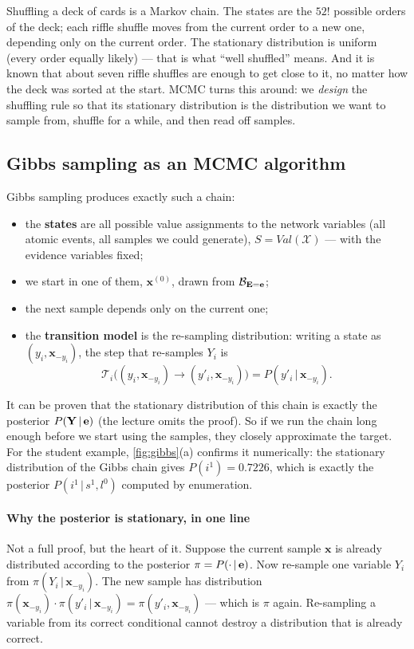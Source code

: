 \documentclass[11pt, oneside]{book}
\newcommand{\Prob}{\mathbb{P}}           %
\newcommand{\given}{\,\vert\,}           %
\newcommand{\Val}{\mathit{Val}}          %
\newcommand{\Xall}{\mathcal{X}}          %
\newcommand{\bx}{\mathbf{x}}  \newcommand{\by}{\mathbf{y}}
\let\originalsubsection\subsection
\renewcommand{\subsection}{\Needspace{6\baselineskip}\originalsubsection}
\begin{document}
\begin{intbox}[unbreakable]
Shuffling a deck of cards is a Markov chain. The states are the $52!$
possible orders of the deck; each riffle shuffle moves from the current order
to a new one, depending only on the current order. The stationary
distribution is uniform (every order equally likely) --- that is what
``well shuffled'' means. And it is known that about seven riffle shuffles are
enough to get close to it, no matter how the deck was sorted at the start.
MCMC turns this around: we \emph{design} the shuffling rule so that its
stationary distribution is the distribution we want to sample from, shuffle
for a while, and then read off samples.
\end{intbox}

\subsection{Gibbs sampling as an MCMC algorithm}

Gibbs sampling produces exactly such a chain:
\begin{itemize}
  \item the \textbf{states} are all possible value assignments to the network
    variables (all atomic events, all samples we could generate),
    $S = \Val(\Xall)$ --- with the evidence variables fixed;
  \item we start in one of them, $\bx^{(0)}$, drawn from
    $\mathcal{B}_{\mathbf{E} = \mathbf{e}}$;
  \item the next sample depends only on the current one;
  \item the \textbf{transition model} is the re-sampling distribution: writing
    a state as $(y_i, \bx_{-y_i})$, the step that re-samples $Y_i$ is
    \[
    \mathcal{T}_i\big((y_i, \bx_{-y_i}) \to (y'_i, \bx_{-y_i})\big) = P(y'_i \given \bx_{-y_i}).
    \]
\end{itemize}
It can be proven that the stationary distribution of this chain is exactly the
posterior $P(\bY \given \be)$ (the lecture omits the proof). So if we run the
chain long enough before we start using the samples, they closely
approximate the target. For the student example, \cref{fig:gibbs}(a) confirms
it numerically: the stationary distribution of the Gibbs chain gives $P(i^1)
= 0.7226$, which is exactly the posterior $P(i^1 \given s^1, l^0)$ computed by
enumeration.

\paragraph{Why the posterior is stationary, in one line} Not a full proof, but the heart of it. Suppose the current sample $\bx$ is
already distributed according to the posterior $\pi = P(\cdot \given \be)$.
Now re-sample one variable $Y_i$ from $\pi(Y_i \given \bx_{-y_i})$. The new
sample has distribution
$\pi(\bx_{-y_i}) \cdot \pi(y'_i \given \bx_{-y_i}) = \pi(y'_i, \bx_{-y_i})$
--- which is $\pi$ again. Re-sampling a variable from its correct conditional
cannot destroy a distribution that is already correct.
\end{document}
